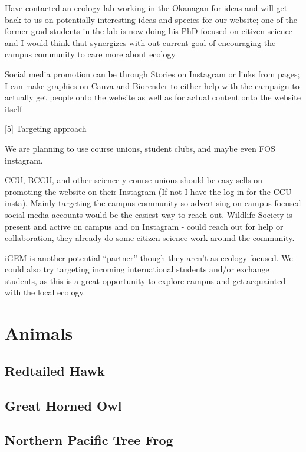 \documentclass[
]{book}
\begin{document}
Have contacted an ecology lab working in the Okanagan for ideas and will get back to us on potentially interesting ideas and species for our website; one of the former grad students in the lab is now doing his PhD focused on citizen science and I would think that synergizes with out current goal of encouraging the campus community to care more about ecology

Social media promotion can be through Stories on Instagram or links from pages; I can make graphics on Canva and Biorender to either help with the campaign to actually get people onto the website as well as for actual content onto the website itself

{{[}5{]} Targeting approach}

We are planning to use course unions, student clubs, and maybe even FOS instagram.

CCU, BCCU, and other science-y course unions should be easy sells on promoting the website on their Instagram (If not I have the log-in for the CCU insta). Mainly targeting the campus community so advertising on campus-focused social media accounts would be the easiest way to reach out. Wildlife Society is present and active on campus and on Instagram - could reach out for help or collaboration, they already do some citizen science work around the community.

iGEM is another potential ``partner'' though they aren't as ecology-focused. We could also try targeting incoming international students and/or exchange students, as this is a great opportunity to explore campus and get acquainted with the local ecology.

\hypertarget{animals}{%
\chapter{Animals}\label{animals}}

\hypertarget{redtailed-hawk}{%
\section{Redtailed Hawk}\label{redtailed-hawk}}

\hypertarget{great-horned-owl}{%
\section{Great Horned Owl}\label{great-horned-owl}}

\hypertarget{northern-pacific-tree-frog}{%
\section{Northern Pacific Tree Frog}\label{northern-pacific-tree-frog}}
\end{document}
